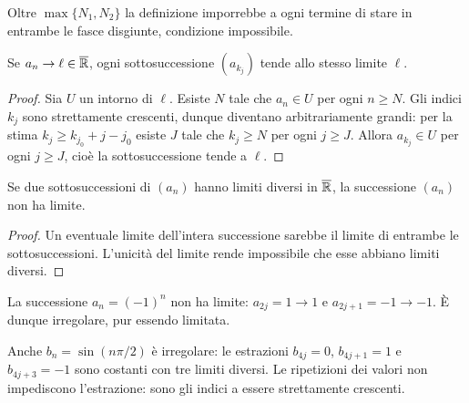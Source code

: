\begin{schema}
\par\smallskip Oltre $\max\{N_1,N_2\}$ la definizione imporrebbe a ogni termine di stare in entrambe le fasce disgiunte, condizione impossibile.
\end{schema}

\begin{proposizione}
Se $a_n\to\ell\in\overline{\mathbb{R}}$, ogni sottosuccessione $(a_{k_j})$ tende allo stesso limite $\ell$.
\end{proposizione}
\begin{proof}
Sia $U$ un intorno di $\ell$. Esiste $N$ tale che $a_n\in U$ per ogni $n\ge N$. Gli indici $k_j$ sono strettamente crescenti, dunque diventano arbitrariamente grandi: per la stima $k_j\ge k_{j_0}+j-j_0$ esiste $J$ tale che $k_j\ge N$ per ogni $j\ge J$. Allora $a_{k_j}\in U$ per ogni $j\ge J$, cioè la sottosuccessione tende a $\ell$.
\end{proof}

\begin{corollario}
Se due sottosuccessioni di $(a_n)$ hanno limiti diversi in $\overline{\mathbb{R}}$, la successione $(a_n)$ non ha limite.
\end{corollario}
\begin{proof}
Un eventuale limite dell'intera successione sarebbe il limite di entrambe le sottosuccessioni. L'unicità del limite rende impossibile che esse abbiano limiti diversi.
\end{proof}

\begin{esempio}
La successione $a_n=(-1)^n$ non ha limite: $a_{2j}=1\to1$ e $a_{2j+1}=-1\to-1$. È dunque irregolare, pur essendo limitata.

Anche $b_n=\sin(n\pi/2)$ è irregolare: le estrazioni $b_{4j}=0$, $b_{4j+1}=1$ e $b_{4j+3}=-1$ sono costanti con tre limiti diversi. Le ripetizioni dei valori non impediscono l'estrazione: sono gli indici a essere strettamente crescenti.
\end{esempio}

